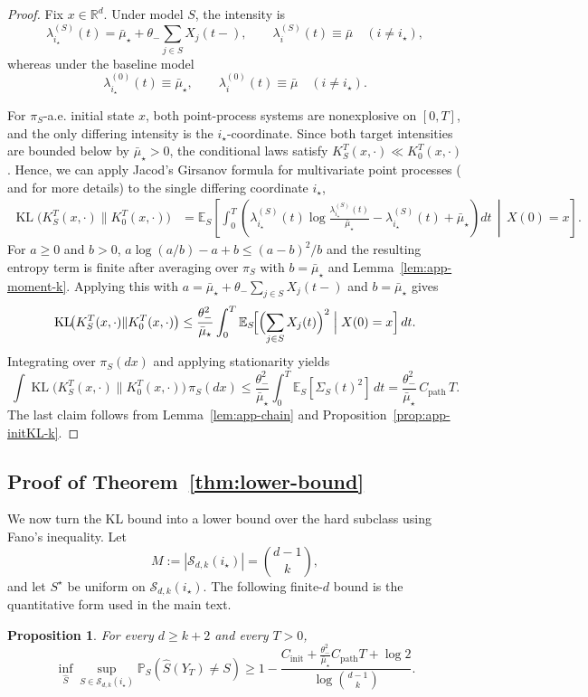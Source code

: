 \documentclass{article}
\newtheorem{proposition}{Proposition}[section]
\newcommand{\KL}{\operatorname{KL}}
\newcommand{\thetalo}{\theta_-}
\newcommand{\R}{\mathbb{R}}
\newcommand{\Pbb}{\mathbb{P}}
\newcommand{\E}{\mathbb{E}}
\begin{document}
\begin{proof}
Fix $x\in\R^d$. Under model $S$, the intensity is
\[
\lambda_{i_\star}^{(S)}(t)=\bar\mu_\star+\thetalo\sum_{j\in S}X_j(t-),
\qquad
\lambda_i^{(S)}(t)\equiv\bar\mu \quad (i\neq i_\star),
\]
whereas under the baseline model
\[
\lambda_{i_\star}^{(0)}(t)\equiv\bar\mu_\star,
\qquad
\lambda_i^{(0)}(t)\equiv\bar\mu \quad (i\neq i_\star).
\]

For \(\pi_S\)-a.e. initial state \(x\), both point-process systems are
nonexplosive on \([0,T]\), and the only differing intensity is the
\(i_\star\)-coordinate. Since both target intensities are bounded below by
\(\bar\mu_\star>0\), the conditional laws satisfy
\(K_S^T(x,\cdot)\ll K_0^T(x,\cdot)\).
Hence, we can apply Jacod's \cite{jacod1975multivariate} Girsanov formula for multivariate point processes (\cite[Chapter~VI]{bremaud1981point} and \cite{kabanov1978capacity} for more details) to the single differing coordinate $i_\star$,
\begin{align}
\KL\!\bigl(K_S^T(x,\cdot)\|K_0^T(x,\cdot)\bigr)
&=
\E_S\!\left[
\int_0^T\!\left(
\lambda_{i_\star}^{(S)}(t)\log\frac{\lambda_{i_\star}^{(S)}(t)}{\bar\mu_\star}
-\lambda_{i_\star}^{(S)}(t)+\bar\mu_\star
\right)\!dt
\,\middle|\, X(0)=x
\right].
\label{eq:app-cond-KL}
\end{align}
For $a\ge 0$ and $b>0$, $a\log(a/b)-a+b\le (a-b)^2/b$ and the resulting entropy term is finite after averaging over $\pi_S$ with $b=\bar\mu_\star$ and
Lemma~\ref{lem:app-moment-k}. Applying this with $a=\bar\mu_\star+\thetalo\sum_{j\in S}X_j(t-)$
and  $b=\bar\mu_\star$ gives
\[
\KL\!\bigl(K_S^T(x,\cdot)\|K_0^T(x,\cdot)\bigr)
\le
\frac{\thetalo^2}{\bar\mu_\star}
\int_0^T \E_S\!\Bigl[\Bigl(\sum_{j\in S}X_j(t)\Bigr)^2\Bigm| X(0)=x\Bigr]\,dt.
\]
Integrating over $\pi_S(dx)$ and applying stationarity yields
\[
\int \KL\!\bigl(K_S^T(x,\cdot)\|K_0^T(x,\cdot)\bigr)\,\pi_S(dx)
\le
\frac{\thetalo^2}{\bar\mu_\star}\int_0^T\!\E_S[\Sigma_S(t)^2]\,dt
=\frac{\thetalo^2}{\bar\mu_\star}\,C_{\mathrm{path}}\,T.
\]
The last claim follows from Lemma~\ref{lem:app-chain} and Proposition~\ref{prop:app-initKL-k}.
\end{proof}




\subsection{Proof of Theorem~\ref{thm:lower-bound}}\label{app:lower-fano}
We now turn the KL bound into a lower bound over the hard subclass using Fano's inequality\cite{gerchinovitz2020fano}.
Let
\[
M:=|\mathcal S_{d,k}(i_\star)|=\binom{d-1}{k},
\]
and let $S^\star$ be uniform on $\mathcal S_{d,k}(i_\star)$. The following
finite-$d$ bound is the quantitative form used in the main text.
\begin{proposition}\label{prop:app-finite-fano}
For every $d\ge k+2$ and every $T>0$,
\[
\inf_{\widehat S}\sup_{S\in\mathcal S_{d,k}(i_\star)}
\Pbb_S(\widehat S(Y_T)\neq S)
\ge
1-
\frac{C_{\mathrm{init}}+\frac{\thetalo^2}{\bar\mu_\star}C_{\mathrm{path}}T+
\log 2}
{\log\binom{d-1}{k}}.
\]
\end{proposition}
\end{document}
